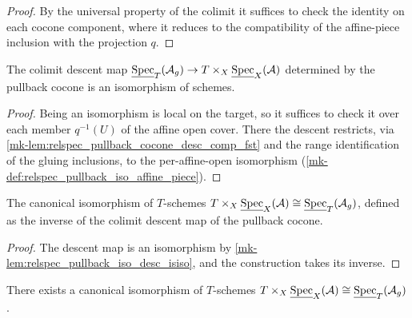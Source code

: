 \begin{proof}
  By the universal property of the colimit it suffices to check the identity on each
  cocone component, where it reduces to the compatibility of the affine-piece
  inclusion with the projection \(q\).
\end{proof}

\begin{lemma}
  \label{mk-lem:relspec_pullback_iso_desc_isiso}

  The colimit descent map
  \(\underline{\operatorname{Spec}}_T(\mathcal{A}_g) \to
    T \times_X \underline{\operatorname{Spec}}_X(\mathcal{A})\)
  determined by the pullback cocone is an isomorphism of schemes.
\end{lemma}

\begin{proof}
  Being an isomorphism is local on the target, so it suffices to check it over each
  member \(q^{-1}(U)\) of the affine open cover. There the descent restricts, via
  \ref{mk-lem:relspec_pullback_cocone_desc_comp_fst} and the range identification of the
  gluing inclusions, to the per-affine-open isomorphism
  (\ref{mk-def:relspec_pullback_iso_affine_piece}).
\end{proof}

\begin{definition}
  \label{mk-def:relspec_pullback_iso_construction}

  The canonical isomorphism of \(T\)-schemes
  \(T \times_X \underline{\operatorname{Spec}}_X(\mathcal{A}) \cong
    \underline{\operatorname{Spec}}_T(\mathcal{A}_g)\),
  defined as the inverse of the colimit descent map of the pullback cocone.
\end{definition}

\begin{proof}
  The descent map is an isomorphism by \ref{mk-lem:relspec_pullback_iso_desc_isiso}, and
  the construction takes its inverse.
\end{proof}

\begin{lemma}
  \label{mk-lem:relspec_pullback_iso}

  There exists a canonical isomorphism of \(T\)-schemes
  \(T \times_X \underline{\operatorname{Spec}}_X(\mathcal{A}) \cong
    \underline{\operatorname{Spec}}_T(\mathcal{A}_g)\).
\end{lemma}

